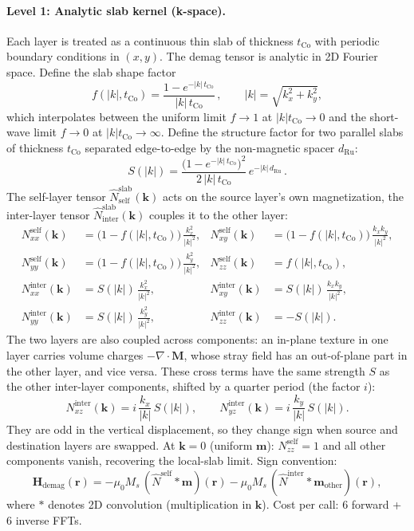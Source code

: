 \documentclass[11pt,a4paper]{article}
\newcommand{\mb}[1]{\mathbf{#1}}
\newcommand{\Hdemag}{\mb{H}_{\text{demag}}}
\newcommand{\tCo}{t_{\text{Co}}}
\newcommand{\Ms}{M_s}
\begin{document}
\paragraph{Level 1: Analytic slab kernel (k-space).}
Each layer is treated as a continuous thin slab of thickness $\tCo$
with periodic boundary conditions in $(x, y)$.  The demag tensor is
analytic in 2D Fourier space.  Define the slab shape factor
%
\begin{equation}
f(|k|, \tCo) = \frac{1 - e^{-|k|\,\tCo}}{|k|\,\tCo}\,,
\qquad |k| = \sqrt{k_x^2 + k_y^2},
\end{equation}
%
which interpolates between the uniform limit
$f \to 1$ at $|k|\tCo \to 0$ and the short-wave limit
$f \to 0$ at $|k|\tCo \to \infty$.  Define the structure factor
for two parallel slabs of thickness $\tCo$ separated edge-to-edge by
the non-magnetic spacer $d_{\text{Ru}}$:
%
\begin{equation}
S(|k|) =
\frac{\bigl(1 - e^{-|k|\,\tCo}\bigr)^2}{2\,|k|\,\tCo}\,
e^{-|k|\,d_{\text{Ru}}}\,.
\end{equation}
%
The self-layer tensor $\hat{N}^{\text{slab}}_{\text{self}}(\mb{k})$
acts on the source layer's own magnetization, the inter-layer tensor
$\hat{N}^{\text{slab}}_{\text{inter}}(\mb{k})$ couples it to the
other layer:
%
\begin{align}
N^{\text{self}}_{xx}(\mb{k}) &=
    \bigl(1 - f(|k|,\tCo)\bigr)\,\frac{k_x^2}{|k|^2} ,
&
N^{\text{self}}_{xy}(\mb{k}) &=
    \bigl(1 - f(|k|,\tCo)\bigr)\,\frac{k_x k_y}{|k|^2} ,
\\
N^{\text{self}}_{yy}(\mb{k}) &=
    \bigl(1 - f(|k|,\tCo)\bigr)\,\frac{k_y^2}{|k|^2} ,
&
N^{\text{self}}_{zz}(\mb{k}) &=
    f(|k|, \tCo) ,
\\
N^{\text{inter}}_{xx}(\mb{k}) &=
    S(|k|)\,\frac{k_x^2}{|k|^2} ,
&
N^{\text{inter}}_{xy}(\mb{k}) &=
    S(|k|)\,\frac{k_x k_y}{|k|^2} ,
\\
N^{\text{inter}}_{yy}(\mb{k}) &=
    S(|k|)\,\frac{k_y^2}{|k|^2} ,
&
N^{\text{inter}}_{zz}(\mb{k}) &=
    -S(|k|) .
\end{align}
%
The two layers are also coupled across components: an in-plane
texture in one layer carries volume charges $-\nabla\cdot\mb{M}$,
whose stray field has an out-of-plane part in the other layer, and
vice versa.  These cross terms have the same strength $S$ as the
other inter-layer components, shifted by a quarter period
(the factor $i$):
%
\begin{equation}
N^{\text{inter}}_{xz}(\mb{k}) = i\,\frac{k_x}{|k|}\,S(|k|),
\qquad
N^{\text{inter}}_{yz}(\mb{k}) = i\,\frac{k_y}{|k|}\,S(|k|).
\end{equation}
%
They are odd in the vertical displacement, so they change sign when
source and destination layers are swapped.  At $\mb{k} = 0$
(uniform $\mb{m}$): $N_{zz}^{\text{self}} = 1$ and all other
components vanish, recovering the local-slab limit.  Sign
convention:
%
\begin{equation}
\Hdemag(\mb{r}) = -\mu_0 \Ms\,(\hat{N}^{\text{self}} * \mb{m})(\mb{r})
                  -\mu_0 \Ms\,(\hat{N}^{\text{inter}} * \mb{m}_{\text{other}})(\mb{r}),
\end{equation}
%
where $*$ denotes 2D convolution (multiplication in $\mb{k}$).
Cost per call: 6 forward + 6 inverse FFTs.
\end{document}
